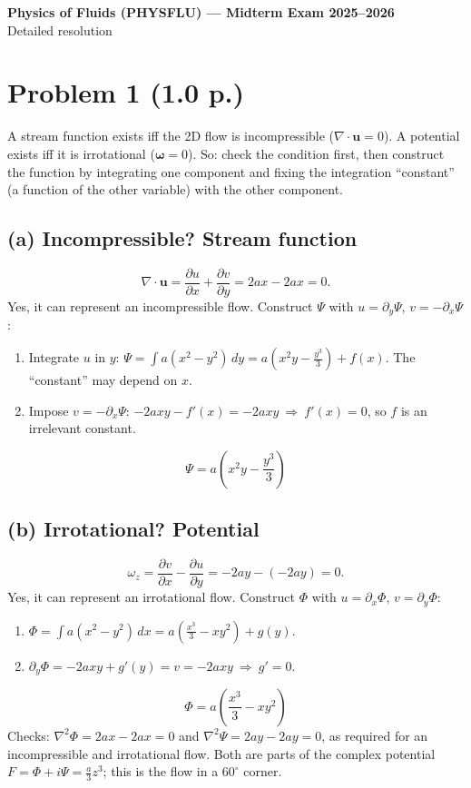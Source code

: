\documentclass[11pt]{article}
\newcommand{\pd}{\partial}
\newcommand{\bu}{\mathbf u}
\newcommand{\bo}{\boldsymbol\omega}
\begin{document}
\begin{center}
{\color{hd}\Large\bfseries Physics of Fluids (PHYSFLU) --- Midterm Exam 2025--2026}\\[3pt]
Detailed resolution
\end{center}

\section*{Problem 1 \normalsize(1.0 p.)}

\begin{strategy}
A stream function exists iff the 2D flow is incompressible ($\nabla\!\cdot\bu=0$). A potential exists iff it is irrotational ($\bo=0$). So: check the condition first, then construct the function by integrating one component and fixing the integration ``constant'' (a function of the other variable) with the other component.
\end{strategy}

\subsection*{(a) Incompressible? Stream function}
\[
\nabla\!\cdot\bu=\frac{\pd u}{\pd x}+\frac{\pd v}{\pd y}=2ax-2ax=0 .
\]
Yes, it can represent an incompressible flow. Construct $\Psi$ with $u=\pd_y\Psi$, $v=-\pd_x\Psi$:
\begin{enumerate}[label=\arabic*.]
\item Integrate $u$ in $y$: $\Psi=\int a(x^2-y^2)\,dy=a\left(x^2y-\frac{y^3}{3}\right)+f(x)$. The ``constant'' may depend on $x$.
\item Impose $v=-\pd_x\Psi$: $-2axy-f'(x)=-2axy\ \Rightarrow\ f'(x)=0$, so $f$ is an irrelevant constant.
\end{enumerate}
\[
\boxed{\Psi=a\left(x^2y-\frac{y^3}{3}\right)}
\]

\subsection*{(b) Irrotational? Potential}
\[
\omega_z=\frac{\pd v}{\pd x}-\frac{\pd u}{\pd y}=-2ay-(-2ay)=0 .
\]
Yes, it can represent an irrotational flow. Construct $\Phi$ with $u=\pd_x\Phi$, $v=\pd_y\Phi$:
\begin{enumerate}[label=\arabic*.]
\item $\Phi=\int a(x^2-y^2)\,dx=a\left(\frac{x^3}{3}-xy^2\right)+g(y)$.
\item $\pd_y\Phi=-2axy+g'(y)=v=-2axy\ \Rightarrow\ g'=0$.
\end{enumerate}
\[
\boxed{\Phi=a\left(\frac{x^3}{3}-xy^2\right)}
\]
Checks: $\nabla^2\Phi=2ax-2ax=0$ and $\nabla^2\Psi=2ay-2ay=0$, as required for an incompressible and irrotational flow. Both are parts of the complex potential $F=\Phi+i\Psi=\frac a3z^3$; this is the flow in a $60^\circ$ corner.
\end{document}
